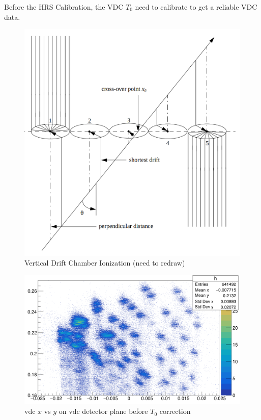 Before the HRS Calibration, the VDC $T_0$ need to calibrate to get a reliable VDC data. 
\begin{figure}[!htbp]
    \centering
    \includegraphics[scale = 0.25]{images/chap4/vdc_wire_ionize.png}
    \caption{Vertical Drift Chamber Ionization (need to redraw)}
    \label{fig:vdc_wire_ionization_cluster}
\end{figure}

\begin{figure}[!htbp]
    \centering
    \includegraphics[width=\textwidth]{images/chap4/vdc_t0_before_correction.png}
    \caption{vdc $x$ vs $y$ on vdc detector plane before $T_0$ correction}
    \label{fig:vdc_t0_before_correction}
\end{figure}
